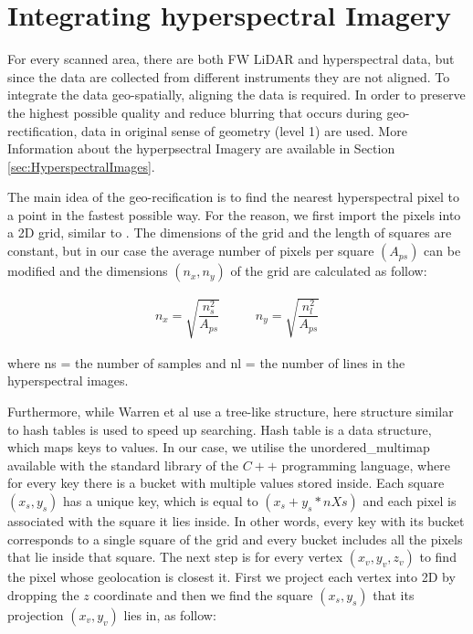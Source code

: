 \documentclass{subfiles}
\begin{document}
	
\section{Integrating hyperspectral Imagery}


	\par For every scanned area, there are both FW LiDAR and hyperspectral data, but since the data are collected from different instruments they are not aligned. To integrate the data geo-spatially, aligning the data is required. In order to preserve the highest possible quality and reduce blurring that occurs during geo-rectification, data in original sense of geometry (level 1) are used. More Information about the hyperpsectral Imagery are available in Section \ref{sec:HyperspectralImages}.
	
	\par The main idea of the geo-recification is to find the nearest hyperspectral pixel to a point in the fastest possible way. For the reason, we first import the pixels into a 2D grid, similar to \cite{Warren2014}. The dimensions of the grid and the length of squares are constant, but in our case the average number of pixels per square $(A_{ps})$ can be modified and the dimensions $(n_x, n_y)$ of the grid are calculated as follow:
	
	\begin{eqnarray}
		n_x=\sqrt{\dfrac{n_s^2}{A_{ps}}} \;\;\;\;\;\;\;\;\;\; n_y=\sqrt{\dfrac{n_l^2}{A_{ps}}}   
	\end{eqnarray} 
	
	\par where ns = the number of samples and
	nl = the number of lines in the hyperspectral images.
	
	\par Furthermore, while Warren et al use a tree-like structure, here  structure similar to hash tables is used to speed up searching. Hash table is a data structure, which maps keys to values. In our case, we utilise the unordered\_multimap available with the standard library of the $C++$ programming language, where for every key there is a bucket with multiple values stored inside. Each square $(x_s,y_s)$	has a unique key, which is equal to $(x_s + y_s *nXs)$ and each pixel is associated with the square it lies inside. In other words, every key with its bucket corresponds to a single square of the grid and every bucket includes all the pixels that lie inside that square. The next step is for every vertex $(x_v, y_v, z_v)$ to find the pixel whose geolocation is closest it. First we project each vertex into 2D by dropping the $z$ coordinate and then we find the square $(x_s , y_s )$ that its projection $(x_v , y_v)$ lies in, as follow:
	
\end{document}
